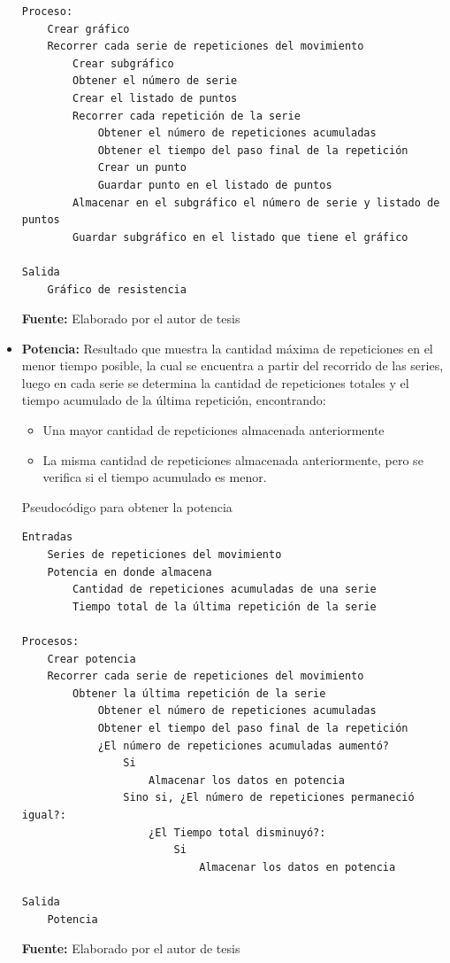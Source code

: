 \begin{itemize}
\begin{code}[H]
\begin{lstlisting}
Proceso:
	Crear gráfico
	Recorrer cada serie de repeticiones del movimiento
		Crear subgráfico
		Obtener el número de serie
		Crear el listado de puntos
		Recorrer cada repetición de la serie
			Obtener el número de repeticiones acumuladas 
			Obtener el tiempo del paso final de la repetición
			Crear un punto
			Guardar punto en el listado de puntos
		Almacenar en el subgráfico el número de serie y listado de puntos
		Guardar subgráfico en el listado que tiene el gráfico

Salida
	Gráfico de resistencia
	\end{lstlisting}
	\textbf{Fuente:} Elaborado por el autor de tesis
\end{code} 

\item \textbf{Potencia:} Resultado que muestra la cantidad m\'axima de repeticiones en el menor tiempo posible, la cual se encuentra a partir del recorrido de las series, luego en cada serie se determina la cantidad de repeticiones totales y el tiempo acumulado de la \'ultima repetici\'on, encontrando: 
	\begin{itemize}
	\item Una mayor cantidad de repeticiones almacenada anteriormente
	\item La misma cantidad de repeticiones almacenada anteriormente, pero se verifica si el tiempo acumulado es menor.
	\end{itemize}
\begin{code}[H]
	\caption{Pseudoc\'odigo para obtener la potencia}
	\label{code:getEndurance}
	\begin{lstlisting}
Entradas
	Series de repeticiones del movimiento
	Potencia en donde almacena
		Cantidad de repeticiones acumuladas de una serie
		Tiempo total de la última repetición de la serie
		
Procesos:
	Crear potencia
	Recorrer cada serie de repeticiones del movimiento
		Obtener la última repetición de la serie
			Obtener el número de repeticiones acumuladas
			Obtener el tiempo del paso final de la repetición
			¿El número de repeticiones acumuladas aumentó?
				Si
					Almacenar los datos en potencia
				Sino si, ¿El número de repeticiones permaneció igual?:
					¿El Tiempo total disminuyó?:
						Si
							Almacenar los datos en potencia
						
Salida
	Potencia 
	\end{lstlisting}
	\textbf{Fuente:} Elaborado por el autor de tesis
\end{code} 


\end{itemize}

